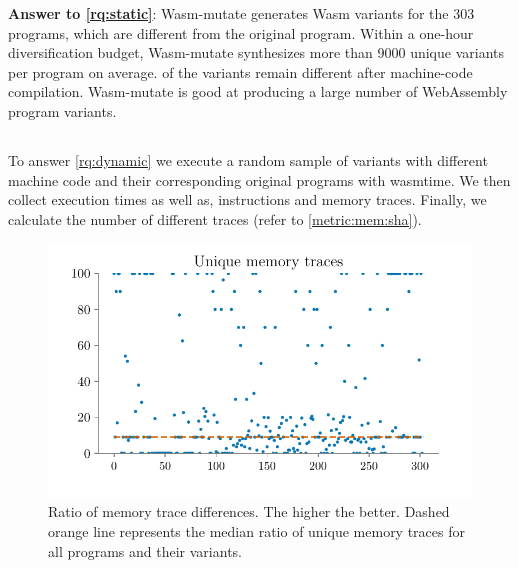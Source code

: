 \documentclass[sigplan,screen]{acmart}
\newcommand{\tool}{Wasm-mutate\xspace}
\newcommand{\wasm}{Wasm\xspace}
\newcommand{\Wasm}{WebAssembly\xspace}
\begin{document}
\begin{tcolorbox}[boxrule=1pt,arc=.3em,boxsep=-1.3mm]
  \textbf{Answer to \ref{rq:static}}: \tool generates \wasm variants for the 303 programs, which are different from the original program. 
  Within a one-hour diversification budget, \tool synthesizes more than 9000 unique  variants per program on average. 
  \preserved of the variants remain different after machine-code compilation.
  \tool is good at producing a large number of \Wasm program variants.
\end{tcolorbox}


\subsection{\rqdynamic}

To answer \ref{rq:dynamic} we execute a random sample of variants with different machine code and their corresponding original programs with wasmtime.
We then collect execution times as well as, instructions and memory traces.
Finally, we calculate the number of different traces (refer to \autoref{metric:mem:sha}).

\begin{figure}
    \centering
    \includegraphics[width=\linewidth]{plots/rq2/memory.pdf}
    \caption{Ratio of memory trace differences. The higher the better. Dashed orange line represents the median ratio of unique memory traces for all programs and their variants.}
  \label{rq2:plot:mem}
\end{figure}
\end{document}
